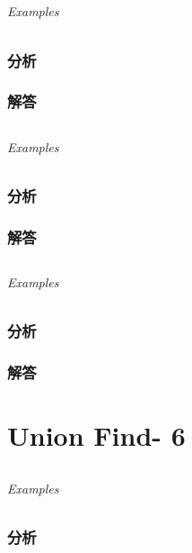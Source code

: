 \documentclass[UTF8,a4paper,12pt]{ctexbook}
\begin{document}
\section{}
	
	\subparagraph{Examples}
	
	\subsection{分析}
	
	\subsection{解答}
	
	
\section{}
	
	\subparagraph{Examples}
	
	\subsection{分析}
	
	\subsection{解答}
	
\section{}
	
	\subparagraph{Examples}
	
	\subsection{分析}
	
	\subsection{解答}
\chapter{Union Find- 6}	
\section{}
	
	\subparagraph{Examples}
	
	\subsection{分析}
	
\end{document}
